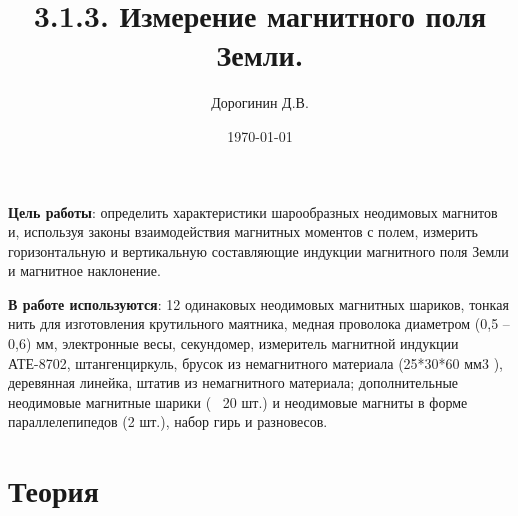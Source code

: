 \documentclass[a4paper,12pt]{article}
\author{Дорогинин Д.В.}
\title{3.1.3. Измерение магнитного поля Земли.}
\date{\today}
\begin{document}
\maketitle
\newpage
\textbf{Цель работы}: определить характеристики шарообразных неодимовых магнитов и, используя
законы взаимодействия магнитных моментов с полем, измерить горизонтальную и вертикальную
составляющие индукции магнитного поля Земли и магнитное наклонение.


\textbf{В работе используются}: 12 одинаковых неодимовых магнитных шариков, тонкая нить для
изготовления крутильного маятника, медная проволока диаметром (0,5 – 0,6) мм, электронные весы,
секундомер, измеритель магнитной индукции АТЕ-8702, штангенциркуль, брусок из немагнитного
материала (25*30*60 мм3
), деревянная линейка, штатив из немагнитного материала;
дополнительные неодимовые магнитные шарики (~ 20 шт.) и неодимовые магниты в форме параллелепипедов (2 шт.), набор гирь и разновесов.
\section*{Теория}
\end{document}
